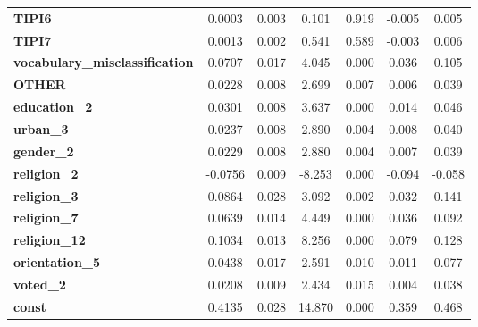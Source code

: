 \documentclass[11pt]{article}
\begin{document}
\begin{center}
\begin{tabular}{lcccccc}
\textbf{TIPI6}                         &       0.0003  &        0.003     &     0.101  &         0.919        &       -0.005    &        0.005     \\
\textbf{TIPI7}                         &       0.0013  &        0.002     &     0.541  &         0.589        &       -0.003    &        0.006     \\
\textbf{vocabulary\_misclassification} &       0.0707  &        0.017     &     4.045  &         0.000        &        0.036    &        0.105     \\
\textbf{OTHER}                         &       0.0228  &        0.008     &     2.699  &         0.007        &        0.006    &        0.039     \\
\textbf{education\_2}                  &       0.0301  &        0.008     &     3.637  &         0.000        &        0.014    &        0.046     \\
\textbf{urban\_3}                      &       0.0237  &        0.008     &     2.890  &         0.004        &        0.008    &        0.040     \\
\textbf{gender\_2}                     &       0.0229  &        0.008     &     2.880  &         0.004        &        0.007    &        0.039     \\
\textbf{religion\_2}                   &      -0.0756  &        0.009     &    -8.253  &         0.000        &       -0.094    &       -0.058     \\
\textbf{religion\_3}                   &       0.0864  &        0.028     &     3.092  &         0.002        &        0.032    &        0.141     \\
\textbf{religion\_7}                   &       0.0639  &        0.014     &     4.449  &         0.000        &        0.036    &        0.092     \\
\textbf{religion\_12}                  &       0.1034  &        0.013     &     8.256  &         0.000        &        0.079    &        0.128     \\
\textbf{orientation\_5}                &       0.0438  &        0.017     &     2.591  &         0.010        &        0.011    &        0.077     \\
\textbf{voted\_2}                      &       0.0208  &        0.009     &     2.434  &         0.015        &        0.004    &        0.038     \\
\textbf{const}                         &       0.4135  &        0.028     &    14.870  &         0.000        &        0.359    &        0.468     \\

\end{tabular}
\end{center}
\end{document}
